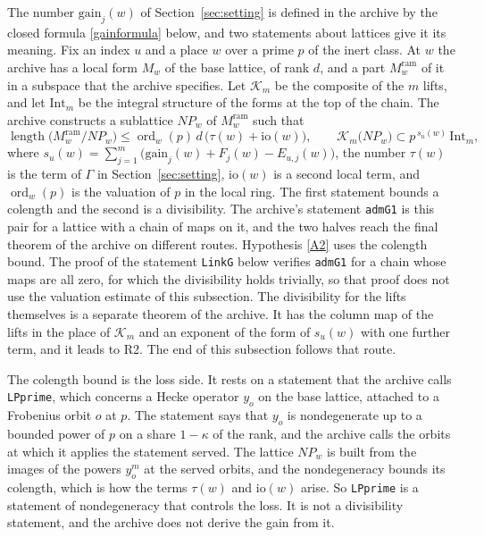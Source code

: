 \documentclass[11pt,letterpaper]{article}
\numberwithin{equation}{section}
\begin{document}
The number $\mathrm{gain}_j(w)$ of Section~\ref{sec:setting} is defined in the archive by the closed formula \eqref{gainformula} below, and two statements about lattices give it its meaning. Fix an index $u$ and a place $w$ over a prime $p$ of the inert class. At $w$ the archive has a local form $M_w$ of the base lattice, of rank $d$, and a part $M_w^{\mathrm{ram}}$ of it in a subspace that the archive specifies. Let $\mathcal K_m$ be the composite of the $m$ lifts, and let $\mathrm{Int}_m$ be the integral structure of the forms at the top of the chain. The archive constructs a sublattice $N\!P_w$ of $M_w^{\mathrm{ram}}$ such that
\begin{equation}\label{twosides}
\operatorname{length}\big(M_w^{\mathrm{ram}}/N\!P_w\big)\le\operatorname{ord}_w(p)\,d\,\big(\tau(w)+\mathrm{io}(w)\big),\qquad
\mathcal K_m\big(N\!P_w\big)\subset p^{\,s_u(w)}\,\mathrm{Int}_m ,
\end{equation}
where $s_u(w)=\sum_{j=1}^m\big(\mathrm{gain}_j(w)+F_j(w)-E_{u,j}(w)\big)$, the number $\tau(w)$ is the term of $\Gamma$ in Section~\ref{sec:setting}, $\mathrm{io}(w)$ is a second local term, and $\operatorname{ord}_w(p)$ is the valuation of $p$ in the local ring. The first statement bounds a colength and the second is a divisibility. The archive's statement \texttt{admG1} is this pair for a lattice with a chain of maps on it, and the two halves reach the final theorem of the archive on different routes. Hypothesis \eqref{A2} uses the colength bound. The proof of the statement \texttt{LinkG} below verifies \texttt{admG1} for a chain whose maps are all zero, for which the divisibility holds trivially, so that proof does not use the valuation estimate of this subsection. The divisibility for the lifts themselves is a separate theorem of the archive. It has the column map of the lifts in the place of $\mathcal K_m$ and an exponent of the form of $s_u(w)$ with one further term, and it leads to R2. The end of this subsection follows that route.

The colength bound is the loss side. It rests on a statement that the archive calls \texttt{LPprime}, which concerns a Hecke operator $y_o$ on the base lattice, attached to a Frobenius orbit $o$ at $p$. The statement says that $y_o$ is nondegenerate up to a bounded power of $p$ on a share $1-\kappa$ of the rank, and the archive calls the orbits at which it applies the statement served. The lattice $N\!P_w$ is built from the images of the powers $y_o^m$ at the served orbits, and the nondegeneracy bounds its colength, which is how the terms $\tau(w)$ and $\mathrm{io}(w)$ arise. So \texttt{LPprime} is a statement of nondegeneracy that controls the loss. It is not a divisibility statement, and the archive does not derive the gain from it.
\end{document}
